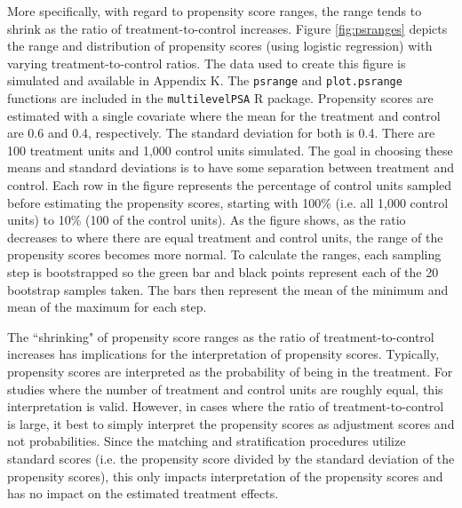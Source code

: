 \documentclass[letterpaper,12p,twoside]{article} %
\begin{document}
More specifically, with regard to propensity score ranges, the range tends to shrink as the ratio of treatment-to-control increases. Figure \ref{fig:psranges} depicts the range and distribution of propensity scores (using logistic regression) with varying treatment-to-control ratios. The data used to create this figure is simulated and available in Appendix K. The \texttt{psrange} and \texttt{plot.psrange} functions are included in the \texttt{multilevelPSA} R package. Propensity scores are estimated with a single covariate where the mean for the treatment and control are 0.6 and 0.4, respectively. The standard deviation for both is 0.4. There are 100 treatment units and 1,000 control units simulated. The goal in choosing these means and standard deviations is to have some separation between treatment and control. Each row in the figure represents the percentage of control units sampled before estimating the propensity scores, starting with 100\% (i.e. all 1,000 control units) to 10\% (100 of the control units). As the figure shows, as the ratio decreases to where there are equal treatment and control units, the range of the propensity scores becomes more normal. To calculate the ranges, each sampling step is bootstrapped so the green bar and black points represent each of the 20 bootstrap samples taken. The bars then represent the mean of the minimum and mean of the maximum for each step.

The ``shrinking" of propensity score ranges as the ratio of treatment-to-control increases has implications for the interpretation of propensity scores. Typically, propensity scores are interpreted as the probability of being in the treatment. For studies where the number of treatment and control units are roughly equal, this interpretation is valid. However, in cases where the ratio of treatment-to-control is large, it best to simply interpret the propensity scores as adjustment scores and not probabilities. Since the matching and stratification procedures utilize standard scores (i.e. the propensity score divided by the standard deviation of the propensity scores), this only impacts interpretation of the propensity scores and has no impact on the estimated treatment effects.

\clearpage
\end{document}
